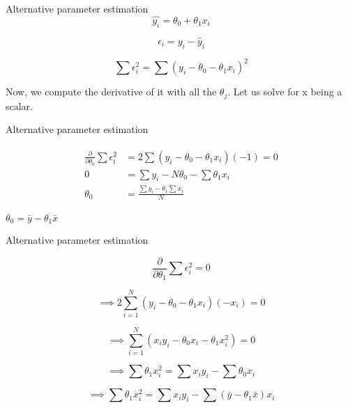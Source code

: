 \documentclass{beamer}
\begin{document}
%    
%    
%    
%
\begin{frame}{Alternative parameter estimation}
    $$
    \hat{y_{i}} = \theta_{0} + \theta_{1}x_{i}
    $$
    
    \pause $$
    \epsilon_{i} = y_{i} - \hat{y}_{i}
    $$
    
    \pause $$
    \sum \epsilon_{i}^{2} = \sum (y_{i} - \theta_{0} - \theta_{1}x_{i})^{2}
    $$
    
    \pause Now, we compute the derivative of it with all the  $\theta_{j}$. Let us solve for x being a scalar.
    
    
\end{frame}




\begin{frame}{Alternative parameter estimation}

\begin{align}
    \begin{split}
        \frac{\partial}{\partial \theta_{0}}\sum \epsilon_{i}^{2} &= 2\sum(y_{i} -  \theta_{0} - \theta_{1}x_{i})(-1) = 0 \\
        0 &= \sum y_{i} -  N\theta_{0} - \sum \theta_{1}x_{i}\\
        \theta_{0} &= \frac{\sum y_{i} - \theta_{1}\sum x_{i}}{N}
    \end{split}
\end{align}


\begin{tcolorbox}
\begin{center}
    $ \theta_{0} = \bar{y} - \theta_{1} \bar{x}$
\end{center}
\end{tcolorbox}
\end{frame}
\begin{frame}{Alternative parameter estimation}

$$
\frac{\partial}{\partial \theta_{1}}\sum \epsilon_{i}^{2} = 0
$$


$$
\implies 2 \sum_{i=1}^{N} (y_{i} - \theta_{0} - \theta_{1}x_{i})(-x_{i}) = 0
$$

$$
\implies \sum_{i=1}^{N} (x_{i}y_{i} - \theta_{0}x_{i} - \theta_{1}x_{i}^{2}) = 0
$$

$$
\implies \sum  \theta_{1}x_{i}^{2} = \sum x_{i}y_{i} - \sum \theta_{0}x_{i}
$$

$$
\implies \sum  \theta_{1}x_{i}^{2} = \sum x_{i}y_{i} - \sum (\bar{y} - \theta_{1}\bar{x})x_i
$$


\end{frame}
\end{document}
